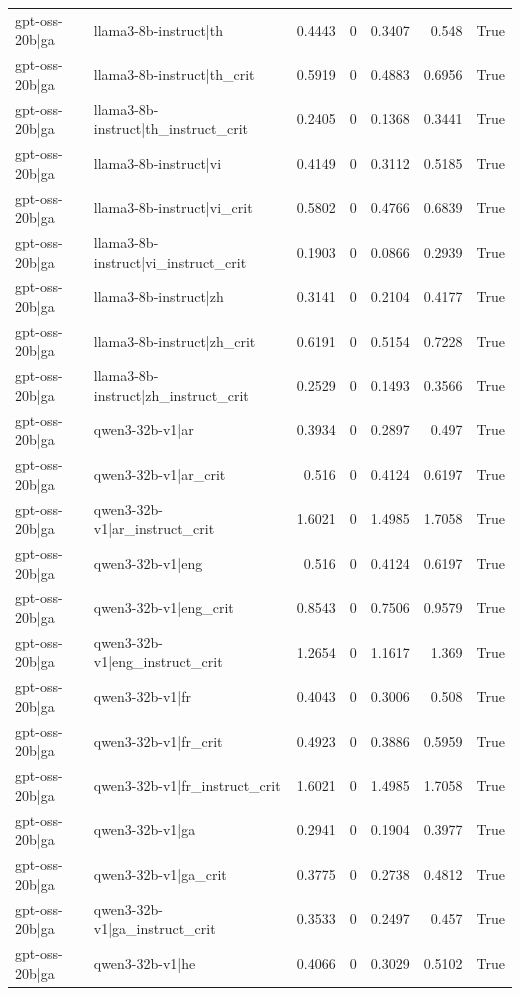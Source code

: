 \begin{table}
\begin{tabular}{l l r r r r l}
gpt-oss-20b|ga & llama3-8b-instruct|th & 0.4443 & 0 & 0.3407 & 0.548 & True \\
gpt-oss-20b|ga & llama3-8b-instruct|th_crit & 0.5919 & 0 & 0.4883 & 0.6956 & True \\
gpt-oss-20b|ga & llama3-8b-instruct|th_instruct_crit & 0.2405 & 0 & 0.1368 & 0.3441 & True \\
gpt-oss-20b|ga & llama3-8b-instruct|vi & 0.4149 & 0 & 0.3112 & 0.5185 & True \\
gpt-oss-20b|ga & llama3-8b-instruct|vi_crit & 0.5802 & 0 & 0.4766 & 0.6839 & True \\
gpt-oss-20b|ga & llama3-8b-instruct|vi_instruct_crit & 0.1903 & 0 & 0.0866 & 0.2939 & True \\
gpt-oss-20b|ga & llama3-8b-instruct|zh & 0.3141 & 0 & 0.2104 & 0.4177 & True \\
gpt-oss-20b|ga & llama3-8b-instruct|zh_crit & 0.6191 & 0 & 0.5154 & 0.7228 & True \\
gpt-oss-20b|ga & llama3-8b-instruct|zh_instruct_crit & 0.2529 & 0 & 0.1493 & 0.3566 & True \\
gpt-oss-20b|ga & qwen3-32b-v1|ar & 0.3934 & 0 & 0.2897 & 0.497 & True \\
gpt-oss-20b|ga & qwen3-32b-v1|ar_crit & 0.516 & 0 & 0.4124 & 0.6197 & True \\
gpt-oss-20b|ga & qwen3-32b-v1|ar_instruct_crit & 1.6021 & 0 & 1.4985 & 1.7058 & True \\
gpt-oss-20b|ga & qwen3-32b-v1|eng & 0.516 & 0 & 0.4124 & 0.6197 & True \\
gpt-oss-20b|ga & qwen3-32b-v1|eng_crit & 0.8543 & 0 & 0.7506 & 0.9579 & True \\
gpt-oss-20b|ga & qwen3-32b-v1|eng_instruct_crit & 1.2654 & 0 & 1.1617 & 1.369 & True \\
gpt-oss-20b|ga & qwen3-32b-v1|fr & 0.4043 & 0 & 0.3006 & 0.508 & True \\
gpt-oss-20b|ga & qwen3-32b-v1|fr_crit & 0.4923 & 0 & 0.3886 & 0.5959 & True \\
gpt-oss-20b|ga & qwen3-32b-v1|fr_instruct_crit & 1.6021 & 0 & 1.4985 & 1.7058 & True \\
gpt-oss-20b|ga & qwen3-32b-v1|ga & 0.2941 & 0 & 0.1904 & 0.3977 & True \\
gpt-oss-20b|ga & qwen3-32b-v1|ga_crit & 0.3775 & 0 & 0.2738 & 0.4812 & True \\
gpt-oss-20b|ga & qwen3-32b-v1|ga_instruct_crit & 0.3533 & 0 & 0.2497 & 0.457 & True \\
gpt-oss-20b|ga & qwen3-32b-v1|he & 0.4066 & 0 & 0.3029 & 0.5102 & True \\

\end{tabular}
\end{table}

